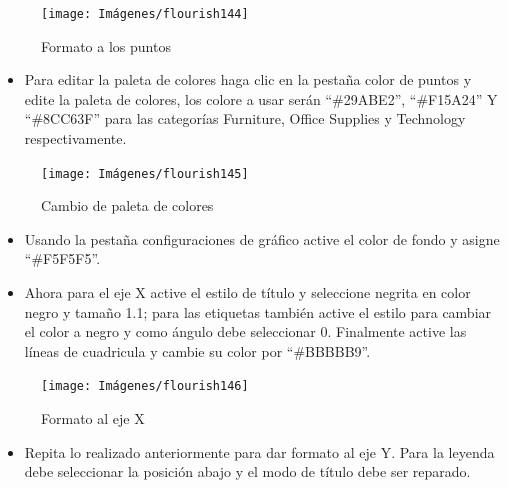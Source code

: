 \documentclass[
]{book}
\providecommand{\tightlist}{%
  \setlength{\itemsep}{0pt}\setlength{\parskip}{0pt}}
\begin{document}
\begin{figure}

{\centering \texttt{[image: Imágenes/flourish144]} 

}

\caption{Formato a los puntos}\label{fig:formatopuntosflourish-fig}
\end{figure}

\begin{itemize}
\tightlist
\item
  Para editar la paleta de colores haga clic en la pestaña color de puntos y edite la paleta de colores, los colore a usar serán ``\#29ABE2'', ``\#F15A24'' Y ``\#8CC63F'' para las categorías Furniture, Office Supplies y Technology respectivamente.
\end{itemize}

\begin{figure}

{\centering \texttt{[image: Imágenes/flourish145]} 

}

\caption{Cambio de paleta de colores}\label{fig:cambiopaletacoloresflourish-fig}
\end{figure}

\begin{itemize}
\item
  Usando la pestaña configuraciones de gráfico active el color de fondo y asigne ``\#F5F5F5''.
\item
  Ahora para el eje X active el estilo de título y seleccione negrita en color negro y tamaño 1.1; para las etiquetas también active el estilo para cambiar el color a negro y como ángulo debe seleccionar 0. Finalmente active las líneas de cuadricula y cambie su color por ``\#BBBBB9''.
\end{itemize}

\begin{figure}

{\centering \texttt{[image: Imágenes/flourish146]} 

}

\caption{Formato al eje X}\label{fig:formatoejexdispersionflourish-fig}
\end{figure}

\begin{itemize}
\tightlist
\item
  Repita lo realizado anteriormente para dar formato al eje Y. Para la leyenda debe seleccionar la posición abajo y el modo de título debe ser reparado.
\end{itemize}
\end{document}
